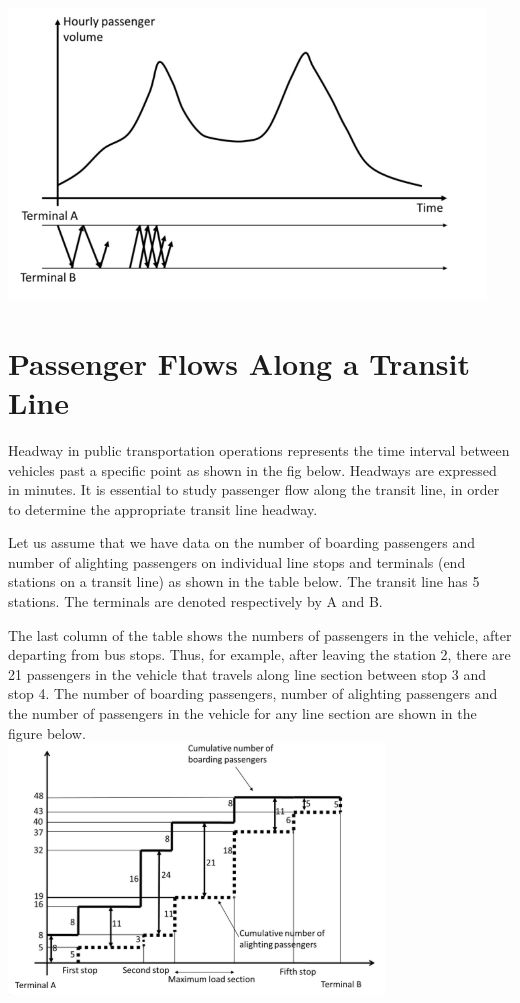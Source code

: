 \includegraphics{gfx/fig20.png}\\
%
\section{Passenger Flows Along a Transit Line}
Headway in public transportation operations represents the time interval between vehicles past a specific point as shown in the fig below. Headways are expressed in minutes. It is essential to study passenger flow along the transit line, in order to determine the appropriate transit line headway.\\
\par
Let us assume that we have data on the number of boarding passengers and number of alighting passengers on individual line stops and terminals (end stations on a transit line) as shown in the table below. The transit line has 5 stations. The terminals are denoted respectively by A and B.\\
\par
The last column of the table shows the numbers of passengers in the vehicle, after departing from bus stops. Thus, for example, after leaving the station 2, there are 21 passengers in the vehicle that travels along line section between stop 3 and stop 4. The number of boarding passengers, number of alighting passengers and the number of passengers in the vehicle for any line section are shown in the figure below.\\
\includegraphics{gfx/fig21.png}\\
